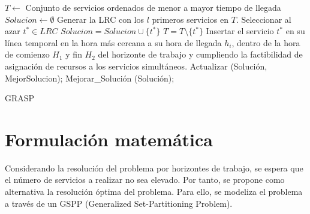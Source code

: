 
\begin{algorithm}[H]
\begin{algorithmic}[1]
           \STATE $T \leftarrow$ Conjunto de servicios ordenados de menor a mayor tiempo de llegada 
           \STATE $Solucion \leftarrow \emptyset$
                \STATE Generar la LRC con los $l$ primeros servicios en $T$.
                \STATE Seleccionar al azar $t^* \in LRC$
                \STATE $Solucion = Solucion \cup \{t^*\}$
                \STATE $T = T \setminus \{t^*\}$
                \STATE Insertar el servicio $t^*$ en su línea temporal en la hora más cercana a su hora de llegada $h_i$, dentro de la hora de comienzo $H_1$ y fin $H_2$ del horizonte de trabajo y cumpliendo la factibilidad de asignación de recursos a los servicios simultáneos.
           \STATE Actualizar (Soluci\'on, MejorSolucion);
           \ENDWHILE
           \STATE Mejorar\_Soluci\'on (Soluci\'on);
      \ENDWHILE
    \caption{GRASP}
\end{algorithmic}    
\end{algorithm}

\section{Formulación matemática}

Considerando la resolución del problema por horizontes de trabajo, se espera que el número de servicios a realizar no sea elevado. Por tanto, se propone como alternativa la resolución óptima del problema. Para ello, se modeliza el problema a través de un GSPP (Generalized Set-Partitioning Problem). 

